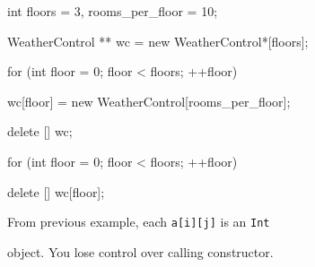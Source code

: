 \begin{console}

int floors = 3, rooms_per_floor = 10;

WeatherControl ** wc = new WeatherControl*[floors];

for (int floor = 0; floor < floors; ++floor)

{   

    wc[floor] = new WeatherControl[rooms_per_floor];

}

delete [] wc;

for (int floor = 0; floor < floors; ++floor)

{   

    delete [] wc[floor];

}

\end{console}

From previous example, each \texttt{a[i][j]} is an \texttt{Int}

object. You lose control over calling constructor.

